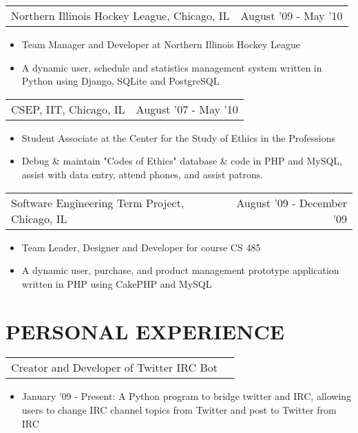 \documentclass[margin, line]{res}
\begin{document}
\begin{resume}
\begin{tabular}{p{3in} r}
	Northern Illinois Hockey League, Chicago, IL &  August '09  - May '10 
\end{tabular}	
	\begin{itemize} \itemsep -2pt
		\item[] Team Manager and Developer at Northern Illinois Hockey League
		\item[] A dynamic user, schedule and statistics management system written in Python using Django, SQLite and PostgreSQL
	\end{itemize}

\begin{tabular}{p{3in} r} %
	CSEP, IIT, Chicago, IL &  August '07 - May '10
\end{tabular}
	\begin{itemize}  \itemsep -2pt%
		\item[] Student Associate at the Center for the Study of Ethics in the Professions
		\item[] Debug \& maintain "Codes of Ethics" database \& code in PHP and MySQL, assist with data entry, attend phones, and assist patrons.
	\end{itemize}
	
\begin{tabular}{p{3in} r} %
	Software Engineering Term Project, Chicago, IL &  August '09 - December '09
\end{tabular}
	\begin{itemize}  \itemsep -2pt%
		\item[] Team Leader, Designer and Developer for course CS 485
		\item[] A dynamic user, purchase, and product management prototype application written in PHP using CakePHP and MySQL
	\end{itemize}

\section{PERSONAL EXPERIENCE}

\begin{tabular}{p{3in} r}
	Creator and Developer of Twitter IRC Bot
\end{tabular}	
	\begin{itemize} \itemsep -2pt
		\item[] January '09 - Present: A Python program to bridge twitter and IRC, allowing users to change IRC channel topics from Twitter and post to Twitter from IRC
	\end{itemize}


\end{resume}
\end{document}

